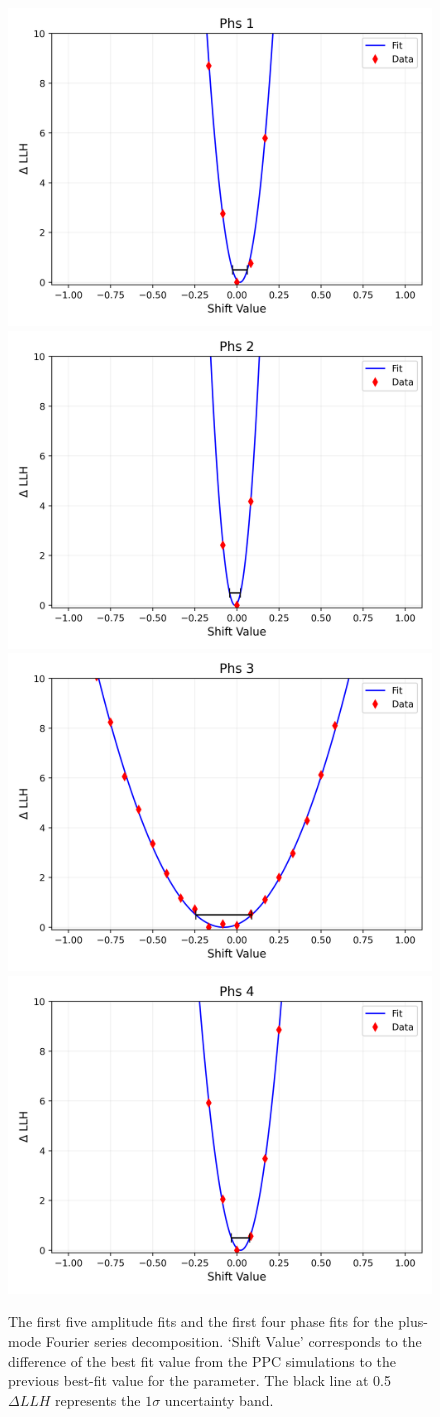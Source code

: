 \documentclass[main.tex]{subfiles}
\begin{document}
\begin{figure}
    \includegraphics[width=0.3\linewidth]{figures/ice_fits/Phs_1_llhfunc.png}\\
    \includegraphics[width=0.3\linewidth]{figures/ice_fits/Phs_2_llhfunc.png}%
    \includegraphics[width=0.3\linewidth]{figures/ice_fits/Phs_3_llhfunc.png}%
    \includegraphics[width=0.3\linewidth]{figures/ice_fits/Phs_4_llhfunc.png}
    \caption{The first five amplitude fits and the first four phase fits for the plus-mode Fourier series decomposition. `Shift Value' corresponds to the difference of the best fit value from the PPC simulations to the previous best-fit value for the parameter. The black line at 0.5 $\Delta LLH$ represents the $1\sigma$ uncertainty band.}\label{fig:linearfit}
\end{figure}
\end{document}
